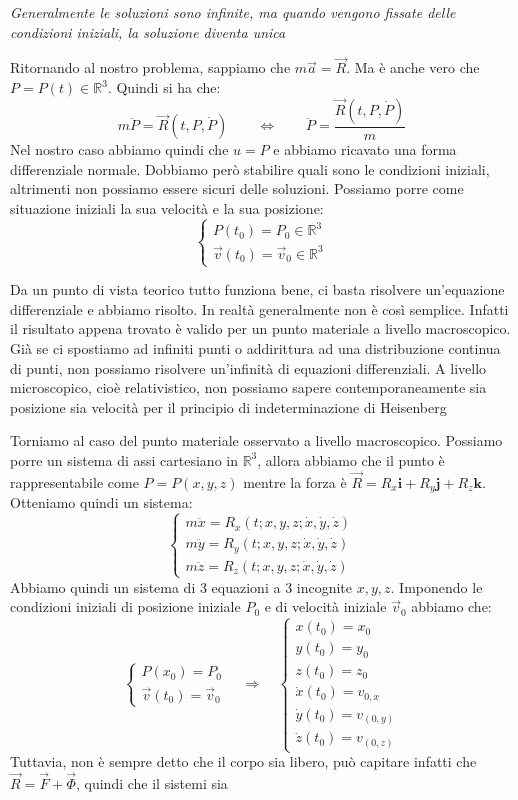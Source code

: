 \documentclass[11pt,a4paper,twoside]{article}
\theoremstyle{definition}
\begin{document}
\textit{Generalmente le soluzioni sono infinite, ma quando vengono fissate delle condizioni iniziali, la soluzione diventa unica}

Ritornando al nostro problema, sappiamo che $m \vec a = \vec R$. Ma è anche vero che $P = P(t)\in \mathbb R^3$. Quindi si ha che:
\[ m\ddot P = \vec R(t, P, \dot P ) \qquad 	\Leftrightarrow \qquad \ddot P = \frac{\vec R(t, P, \dot P)}m\]
Nel nostro caso abbiamo quindi che $u = P$ e abbiamo ricavato una forma differenziale normale. Dobbiamo però stabilire quali sono le condizioni iniziali, altrimenti non possiamo essere sicuri delle soluzioni. Possiamo porre come situazione iniziali la sua velocità e la sua posizione:
\[ \begin{cases}
	P(t_0) = P_0 \in \mathbb R^3\\
	\vec v(t_0) = \vec v_0 \in \mathbb R^3
\end{cases}\]

Da un punto di vista teorico tutto funziona bene, ci basta risolvere un'equazione differenziale e abbiamo risolto. In realtà generalmente non è così semplice. Infatti il risultato appena trovato è valido per un punto materiale a livello macroscopico. Già se ci spostiamo ad infiniti punti o addirittura ad una distribuzione continua di punti, non possiamo risolvere un'infinità di equazioni differenziali.
A livello microscopico, cioè relativistico, non possiamo sapere contemporaneamente sia posizione sia velocità per il principio di indeterminazione di Heisenberg

Torniamo al caso del punto materiale osservato a livello macroscopico. Possiamo porre un sistema di assi cartesiano in $\mathbb R^3$, allora abbiamo che il punto è rappresentabile come $P = P(x,y,z)$ mentre la forza è $\vec R = R_x\mathbf i + R_y\mathbf j + R_z \mathbf k$. Otteniamo quindi un sistema:
\[ \begin{cases}
	m\ddot x = R_x(t;x,y,z;\dot x, \dot y, \dot z)\\
	m\ddot y = R_y(t;x,y,z;\dot x, \dot y, \dot z)\\
	m\ddot z = R_z(t;x,y,z;\dot x, \dot y, \dot z)
\end{cases} \]
Abbiamo quindi un sistema di $3$ equazioni a $3$ incognite $x,y,z$. Imponendo le condizioni iniziali di posizione iniziale $P_0$ e di velocità iniziale $\vec v_0$ abbiamo che:
\[
	\begin{cases}
		P(x_0) = P_0\\
		\vec v(t_0) = \vec v_0
	\end{cases} \quad \Rightarrow \quad
	\begin{cases}
		x(t_0) = x_0\\
		y(t_0) = y_0\\
		z(t_0) = z_0\\
		\dot x(t_0) = v_{0,x}\\
		\dot y(t_0) = v_(0,y)\\
		\dot z(t_0) = v_(0,z)
	\end{cases}
\]
Tuttavia, non è sempre detto che il corpo sia libero, può capitare infatti che $\vec R = \vec F + \vec \Phi$, quindi che il sistemi sia
\end{document}

